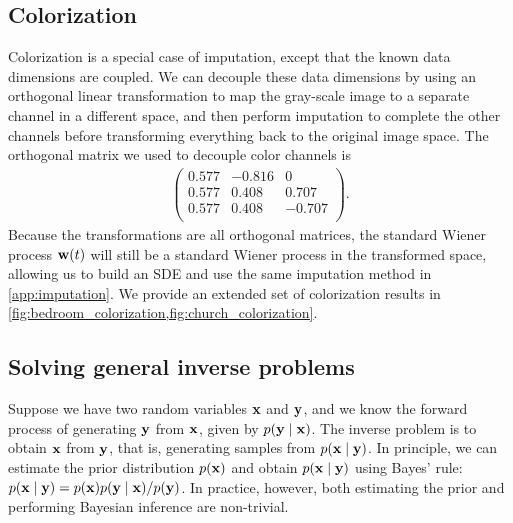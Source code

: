 \subsection{Colorization}\label{app:colorization}
Colorization is a special case of imputation, except that the known data dimensions are coupled. We can decouple these data dimensions by using an orthogonal linear transformation to map the gray-scale image to a separate channel in a different space, and then perform imputation to complete the other channels before transforming everything back to the original image space. The orthogonal matrix we used to decouple color channels is
\begin{align*}
    \begin{pmatrix}
        0.577 &  -0.816 &  0\\
        0.577 &  0.408 &  0.707\\
        0.577 &  0.408 & -0.707\\
    \end{pmatrix}.
\end{align*}
Because the transformations are all orthogonal matrices, the standard Wiener process $\mathbf{w}(t)$ will still be a standard Wiener process in the transformed space, allowing us to build an SDE and use the same imputation method in \cref{app:imputation}. We provide an extended set of colorization results in \cref{fig:bedroom_colorization,fig:church_colorization}.

\subsection{Solving general inverse problems}\label{app:inverse_prob}
Suppose we have two random variables $\mathbf{x}$ and $\mathbf{y}$, and we know the forward process of generating $\mathbf{y}$ from $\mathbf{x}$, given by $p(\mathbf{y} \mid \mathbf{x})$. The inverse problem is to obtain $\mathbf{x}$ from $\mathbf{y}$, that is, generating samples from $p(\mathbf{x} \mid \mathbf{y})$. In principle, we can estimate the prior distribution $p(\mathbf{x})$ and obtain $p(\mathbf{x} \mid \mathbf{y})$ using Bayes' rule: $p(\mathbf{x} \mid \mathbf{y}) = p(\mathbf{x}) p(\mathbf{y} \mid \mathbf{x}) / p(\mathbf{y})$. In practice, however, both estimating the prior and performing Bayesian inference are non-trivial.

